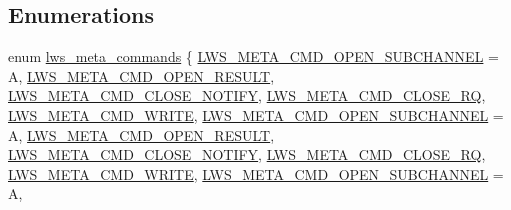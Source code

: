 \subsection*{Enumerations}
\begin{DoxyCompactItemize}
\item 
enum \hyperlink{group__lwsmeta_ga6fbab5a2f1a1ef7af39af745e0b4a4fe}{lws\+\_\+meta\+\_\+commands} \{ \newline
\hyperlink{group__lwsmeta_gga6fbab5a2f1a1ef7af39af745e0b4a4fea36639b9c84a4eae74691be4c402d89c9}{L\+W\+S\+\_\+\+M\+E\+T\+A\+\_\+\+C\+M\+D\+\_\+\+O\+P\+E\+N\+\_\+\+S\+U\+B\+C\+H\+A\+N\+N\+EL} = \textquotesingle{}A\textquotesingle{}, 
\hyperlink{group__lwsmeta_gga6fbab5a2f1a1ef7af39af745e0b4a4feaf9bac70d7ab4bab06adeb9e03f5cc344}{L\+W\+S\+\_\+\+M\+E\+T\+A\+\_\+\+C\+M\+D\+\_\+\+O\+P\+E\+N\+\_\+\+R\+E\+S\+U\+LT}, 
\hyperlink{group__lwsmeta_gga6fbab5a2f1a1ef7af39af745e0b4a4fea38a291a2d858ee6dae1790ee19774d38}{L\+W\+S\+\_\+\+M\+E\+T\+A\+\_\+\+C\+M\+D\+\_\+\+C\+L\+O\+S\+E\+\_\+\+N\+O\+T\+I\+FY}, 
\hyperlink{group__lwsmeta_gga6fbab5a2f1a1ef7af39af745e0b4a4fea4a50e4fe1e50bbc8f2ff7bbda042c1aa}{L\+W\+S\+\_\+\+M\+E\+T\+A\+\_\+\+C\+M\+D\+\_\+\+C\+L\+O\+S\+E\+\_\+\+RQ}, 
\newline
\hyperlink{group__lwsmeta_gga6fbab5a2f1a1ef7af39af745e0b4a4fea6d0b758b0209f52c3dd8b262585cf850}{L\+W\+S\+\_\+\+M\+E\+T\+A\+\_\+\+C\+M\+D\+\_\+\+W\+R\+I\+TE}, 
\hyperlink{group__lwsmeta_gga6fbab5a2f1a1ef7af39af745e0b4a4fea36639b9c84a4eae74691be4c402d89c9}{L\+W\+S\+\_\+\+M\+E\+T\+A\+\_\+\+C\+M\+D\+\_\+\+O\+P\+E\+N\+\_\+\+S\+U\+B\+C\+H\+A\+N\+N\+EL} = \textquotesingle{}A\textquotesingle{}, 
\hyperlink{group__lwsmeta_gga6fbab5a2f1a1ef7af39af745e0b4a4feaf9bac70d7ab4bab06adeb9e03f5cc344}{L\+W\+S\+\_\+\+M\+E\+T\+A\+\_\+\+C\+M\+D\+\_\+\+O\+P\+E\+N\+\_\+\+R\+E\+S\+U\+LT}, 
\hyperlink{group__lwsmeta_gga6fbab5a2f1a1ef7af39af745e0b4a4fea38a291a2d858ee6dae1790ee19774d38}{L\+W\+S\+\_\+\+M\+E\+T\+A\+\_\+\+C\+M\+D\+\_\+\+C\+L\+O\+S\+E\+\_\+\+N\+O\+T\+I\+FY}, 
\newline
\hyperlink{group__lwsmeta_gga6fbab5a2f1a1ef7af39af745e0b4a4fea4a50e4fe1e50bbc8f2ff7bbda042c1aa}{L\+W\+S\+\_\+\+M\+E\+T\+A\+\_\+\+C\+M\+D\+\_\+\+C\+L\+O\+S\+E\+\_\+\+RQ}, 
\hyperlink{group__lwsmeta_gga6fbab5a2f1a1ef7af39af745e0b4a4fea6d0b758b0209f52c3dd8b262585cf850}{L\+W\+S\+\_\+\+M\+E\+T\+A\+\_\+\+C\+M\+D\+\_\+\+W\+R\+I\+TE}, 
\hyperlink{group__lwsmeta_gga6fbab5a2f1a1ef7af39af745e0b4a4fea36639b9c84a4eae74691be4c402d89c9}{L\+W\+S\+\_\+\+M\+E\+T\+A\+\_\+\+C\+M\+D\+\_\+\+O\+P\+E\+N\+\_\+\+S\+U\+B\+C\+H\+A\+N\+N\+EL} = \textquotesingle{}A\textquotesingle{}, 

\end{DoxyCompactItemize}

